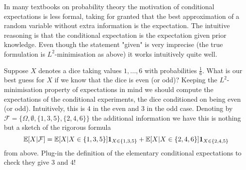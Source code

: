 In many textbooks on probability theory the motivation of conditional expectations is less formal, taking for granted that the best approximation of a random variable without extra information is the expectation. The intuitive reasoning is that the conditional expectation is the expectation given prior knowledge. Even though the statement "{}given"{} is very imprecise (the true formulation is $L^2$-minimisation as above) it works intuitively quite well. 
\begin{example}
	Suppose $X$ denotes a dice taking values $1,...,6$ with probabilities $\frac 1 6$. What is our best guess for $X$ if we know that the dice is even (or odd)? Keeping the $L^2$-minimisation property of expectations in mind we should  compute the expectations of the conditional experiments, the dice conditioned on being even (or odd). Intuitively, this is $4$ in the even and $3$ in the odd case. Denoting by $\mathcal F=\{\Omega, \emptyset, \{1,3,5\},\{2,4,6\}\}$ the additional information we have this is nothing but a sketch of the rigorous formula $$\mathbb{E}[X|\mathcal F]= \mathbb{E}[X|X \in \{1,3,5\} ] \mathbf 1_{X\in \{1,3,5\}}+\mathbb{E}[X|X\in \{2,4,6\}]\mathbf 1_{X\in \{2,4,5\}}$$ from above. Plug-in the definition of the elementary conditional expectations to check they give $3$ and $4$! 
\end{example}


